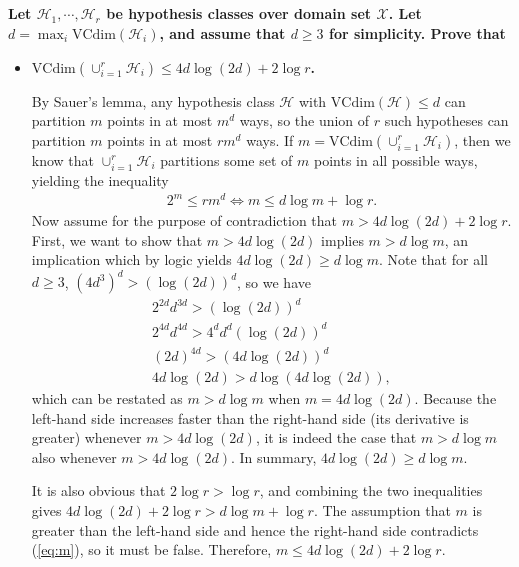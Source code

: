 \documentclass[a4paper,12pt]{article}
\theoremstyle{remark}
\begin{document}
\subsection{}
    \boldmath\textbf{Let $\mathcal{H}_1, \cdots, \mathcal{H}_r$ be hypothesis classes over domain set $\mathcal{X}$. Let $d = \max_i \mathrm{VCdim}(\mathcal{H}_i)$, and assume that $d \geq 3$ for simplicity. Prove that
    }\unboldmath \par
    \begin{itemize}
        \item
            \boldmath\textbf{$\mathrm{VCdim}(\cup_{i = 1}^r \mathcal{H}_i) \leq 4d\log(2d) + 2\log r$.
            }\unboldmath \par
            By Sauer's lemma, any hypothesis class $\mathcal{H}$ with $\mathrm{VCdim}(\mathcal{H}) \leq d$ can partition $m$ points in at most $m^d$ ways, so the union of $r$ such hypotheses can partition $m$ points in at most $rm^d$ ways. If $m = \mathrm{VCdim}(\cup_{i = 1}^r \mathcal{H}_i)$, then we know that $\cup_{i = 1}^r \mathcal{H}_i$ partitions some set of $m$ points in all possible ways, yielding the inequality
            \begin{align} \label{eq:m}
                2^m \leq rm^d \Leftrightarrow m \leq d\log m + \log r.
            \end{align}
            Now assume for the purpose of contradiction that $m > 4d\log(2d) + 2\log r$. First, we want to show that $m > 4d\log(2d)$ implies $m > d\log m$, an implication which by logic yields $4d\log(2d) \geq d\log m$. Note that for all $d \geq 3$, $(4d^3)^d > (\log(2d))^d$, so we have
            \begin{gather*}
                2^{2d} d^{3d} > (\log(2d))^d \\
                2^{4d} d^{4d} > 4^d d^d (\log(2d))^d \\
                (2d)^{4d} > (4d\log(2d))^d \\
                4d\log(2d) > d\log(4d\log(2d)),
            \end{gather*}
            which can be restated as $m > d\log m$ when $m = 4d\log(2d)$. Because the left-hand side increases faster than the right-hand side (its derivative is greater) whenever $m > 4d\log(2d)$, it is indeed the case that $m > d\log m$ also whenever $m > 4d\log(2d)$. In summary, $4d\log(2d) \geq d\log m$. \par
            It is also obvious that $2\log r > \log r$, and combining the two inequalities gives $4d\log(2d) + 2\log r > d\log m + \log r$. The assumption that $m$ is greater than the left-hand side and hence the right-hand side contradicts (\ref{eq:m}), so it must be false. Therefore, $m \leq 4d\log(2d) + 2\log r$.

\end{itemize}
\end{document}
